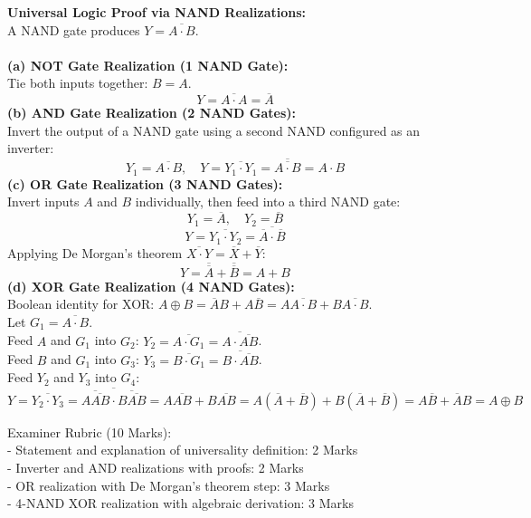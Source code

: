 \begin{solbox}
\textbf{Universal Logic Proof via NAND Realizations:}\\
A NAND gate produces $Y = \overline{A \cdot B}$.\\\\
\textbf{(a) NOT Gate Realization (1 NAND Gate):}\\
Tie both inputs together: $B = A$.\\
\[ Y = \overline{A \cdot A} = \overline{A} \]
\textbf{(b) AND Gate Realization (2 NAND Gates):}\\
Invert the output of a NAND gate using a second NAND configured as an inverter:\\
\[ Y_1 = \overline{A \cdot B}, \quad Y = \overline{Y_1 \cdot Y_1} = \overline{\overline{A \cdot B}} = A \cdot B \]
\textbf{(c) OR Gate Realization (3 NAND Gates):}\\
Invert inputs $A$ and $B$ individually, then feed into a third NAND gate:\\
\[ Y_1 = \overline{A}, \quad Y_2 = \overline{B} \]
\[ Y = \overline{Y_1 \cdot Y_2} = \overline{\overline{A} \cdot \overline{B}} \]
Applying De Morgan's theorem $\overline{X \cdot Y} = \overline{X} + \overline{Y}$:\\
\[ Y = \overline{\overline{A}} + \overline{\overline{B}} = A + B \]
\textbf{(d) XOR Gate Realization (4 NAND Gates):}\\
Boolean identity for XOR: $A \oplus B = \overline{A}B + A\overline{B} = A\overline{A \cdot B} + B\overline{A \cdot B}$.\\
Let $G_1 = \overline{A \cdot B}$.\\
Feed $A$ and $G_1$ into $G_2$: $Y_2 = \overline{A \cdot G_1} = \overline{A \cdot \overline{AB}}$.\\
Feed $B$ and $G_1$ into $G_3$: $Y_3 = \overline{B \cdot G_1} = \overline{B \cdot \overline{AB}}$.\\
Feed $Y_2$ and $Y_3$ into $G_4$:\\
\[ Y = \overline{Y_2 \cdot Y_3} = \overline{\overline{A\overline{AB}} \cdot \overline{B\overline{AB}}} = A\overline{AB} + B\overline{AB} = A(\overline{A}+\overline{B}) + B(\overline{A}+\overline{B}) = A\overline{B} + \overline{A}B = A \oplus B \]
\end{solbox}

\begin{examinertip}
Examiner Rubric (10 Marks):\\
- Statement and explanation of universality definition: 2 Marks\\
- Inverter and AND realizations with proofs: 2 Marks\\
- OR realization with De Morgan's theorem step: 3 Marks\\
- 4-NAND XOR realization with algebraic derivation: 3 Marks
\end{examinertip}


